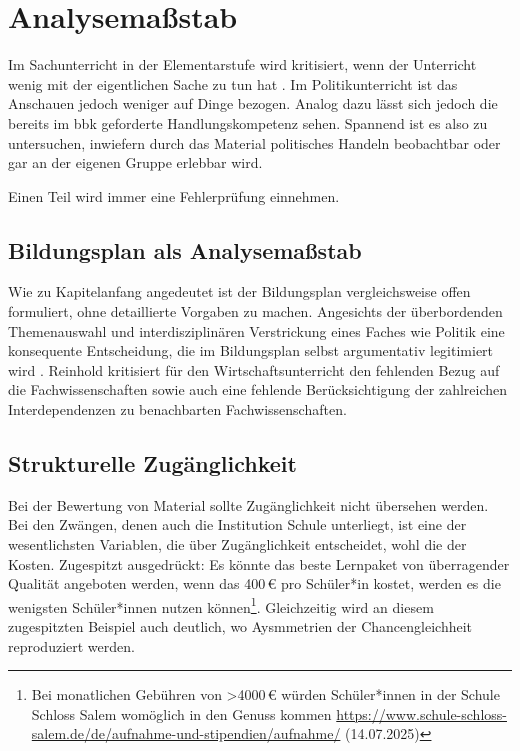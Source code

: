 \section{Analysemaßstab}
Im Sachunterricht in der Elementarstufe wird kritisiert, wenn der Unterricht wenig mit der eigentlichen Sache zu tun hat \autocite[2-4]{Scholz2004}. Im Politikunterricht ist das Anschauen jedoch weniger auf Dinge bezogen. Analog dazu lässt sich jedoch die bereits im \gls{bbk} geforderte Handlungskompetenz sehen. Spannend ist es also zu untersuchen, inwiefern durch das Material politisches Handeln beobachtbar oder gar an der eigenen Gruppe erlebbar wird.

Einen Teil wird immer eine Fehlerprüfung einnehmen. 

\subsection{Bildungsplan als Analysemaßstab}

Wie zu Kapitelanfang angedeutet ist der Bildungsplan vergleichsweise offen formuliert, ohne detaillierte Vorgaben zu machen. Angesichts der überbordenden Themenauswahl und interdisziplinären Verstrickung eines Faches wie Politik eine konsequente Entscheidung, die im Bildungsplan selbst argumentativ legitimiert wird \autocite[diggah, welche Seite habe ich das gelesen]{bplan}. Reinhold \textcite[17-18]{Hedtke2016} kritisiert für den Wirtschaftsunterricht den fehlenden Bezug auf die Fachwissenschaften sowie auch eine fehlende Berücksichtigung der zahlreichen Interdependenzen zu benachbarten Fachwissenschaften. 



\subsection{Strukturelle Zugänglichkeit}
Bei der Bewertung von Material sollte Zugänglichkeit nicht übersehen werden. Bei den Zwängen, denen auch die Institution Schule unterliegt, ist eine der wesentlichsten Variablen, die über Zugänglichkeit entscheidet, wohl die der Kosten.
Zugespitzt ausgedrückt: Es könnte das beste Lernpaket von überragender Qualität angeboten werden, wenn das 400\,€ pro Schüler*in kostet, werden es die wenigsten Schüler*innen nutzen können\footnote{
    Bei monatlichen Gebühren von >4000\,€ würden Schüler*innen in der Schule Schloss Salem womöglich in den Genuss kommen \url{https://www.schule-schloss-salem.de/de/aufnahme-und-stipendien/aufnahme/} (14.07.2025)
}. Gleichzeitig wird an diesem zugespitzten Beispiel auch deutlich, wo Aysmmetrien der Chancengleichheit reproduziert werden. 

